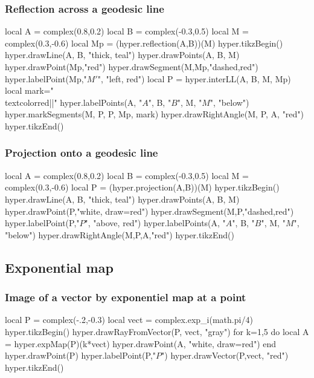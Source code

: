 \documentclass{article}
\begin{document}
\subsubsection{Reflection across a geodesic line}
\begin{codeandresult}
\begin{luacode*}
local A = complex(0.8,0.2)
local B = complex(-0.3,0.5)
local M = complex(0.3,-0.6)
local Mp = (hyper.reflection(A,B))(M)
hyper.tikzBegin()
hyper.drawLine(A, B, "thick, teal")
hyper.drawPoints(A, B, M)
hyper.drawPoint(Mp,"red")
hyper.drawSegment(M,Mp,"dashed,red")
hyper.labelPoint(Mp,"$M'$", "left, red")
local P = hyper.interLL(A, B, M, Mp)
local mark="\\textcolor{red}{||}"
hyper.labelPoints(A, "$A$", B, "$B$", M, "$M$", "below")
hyper.markSegments(M, P, P, Mp, mark)
hyper.drawRightAngle(M, P, A, "red")
hyper.tikzEnd()
\end{luacode*}
\end{codeandresult}

\subsubsection{Projection onto a geodesic line}
\begin{codeandresult}
\begin{luacode*}
local A = complex(0.8,0.2)
local B = complex(-0.3,0.5)
local M = complex(0.3,-0.6)
local P = (hyper.projection(A,B))(M)
hyper.tikzBegin()
hyper.drawLine(A, B, "thick, teal")
hyper.drawPoints(A, B, M)
hyper.drawPoint(P,"white, draw=red")
hyper.drawSegment(M,P,"dashed,red")
hyper.labelPoint(P,"$P$", "above, red")
hyper.labelPoints(A, "$A$", B, "$B$", M, "$M$", "below")
hyper.drawRightAngle(M,P,A,"red")
hyper.tikzEnd()
\end{luacode*}
\end{codeandresult}

\subsection{Exponential map}
\subsubsection{Image of a vector by exponentiel map at a point}

\begin{codeandresult}
\begin{luacode*}
local P = complex(-.2,-0.3)
local vect = complex.exp_i(math.pi/4)
hyper.tikzBegin()
hyper.drawRayFromVector(P, vect, "gray")
for k=1,5 do
	local A = hyper.expMap(P)(k*vect)
	hyper.drawPoint(A, "white, draw=red")
end
hyper.drawPoint(P)
hyper.labelPoint(P,"$P$")
hyper.drawVector(P,vect, "red")
hyper.tikzEnd()
\end{luacode*}
\end{codeandresult}
\end{document}
